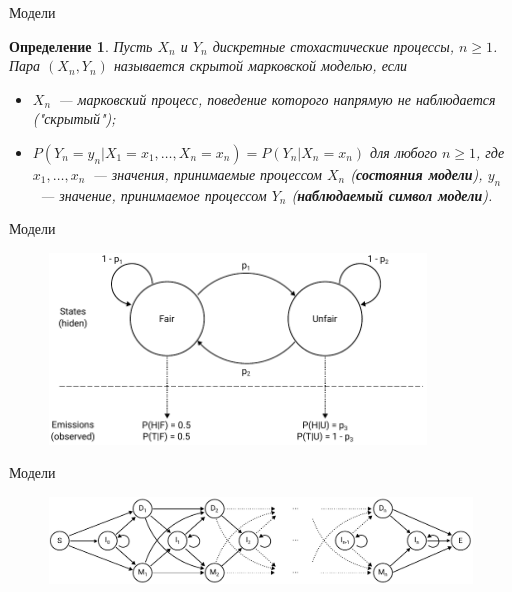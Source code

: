 \documentclass{beamer}
\newtheorem{defenition}{Определение}
\begin{document}
	\begin{frame}{Модели}
		\begin{defenition}
			Пусть $X_{n}$ и $Y_{n}$ дискретные стохастические процессы, $n \geq 1$. Пара $(X_{n}, Y_{n})$ называется скрытой марковской моделью, если
			\begin{itemize}
				\item $X_{n}$~--- марковский процесс, поведение которого напрямую не наблюдается ("скрытый");
				\item $P(Y_{n} = y_{n}|X_{1} = x_{1},\dots, X_{n} = x_{n}) = P(Y_{n}|X_{n}=x_{n})$ для любого $n \geq 1$, где $x_{1},\dots,x_{n}$~--- значения, принимаемые процессом  $X_{n}$ (\textbf{состояния модели}), $ y_{n}$~--- значение, принимаемое процессом $Y_{n}$ (\textbf{наблюдаемый символ модели}).
			\end{itemize}
		\end{defenition}		
	\end{frame}

	\begin{frame}{Модели}
		\begin{figure}[h]
			\includegraphics[width=10cm]{../report/figure1}
		\end{figure}
	\end{frame}

	\begin{frame}{Модели}
		\begin{figure}[h]
			\includegraphics[width=12cm]{../report/figure2}
		\end{figure}		
	\end{frame}
\end{document}
